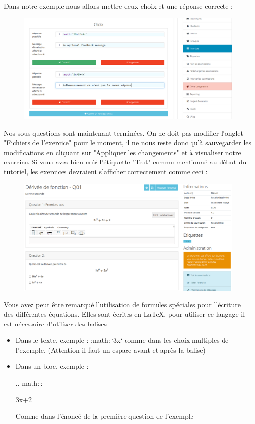 \documentclass{article}
\begin{document}
Dans notre exemple nous allons mettre deux choix et une réponse correcte :

\begin{figure}[!htb]
    \centering
    \includegraphics[scale=0.5]{images/qcm.png}
\end{figure}

\newpage
Nos sous-questions sont maintenant terminées. On ne doit pas modifier l'onglet "Fichiers de l'exercice" pour le moment, il ne nous reste donc qu'à sauvegarder les modifications en cliquant sur "Appliquer les changements" et à visualiser notre exercice.
Si vous avez bien créé l'étiquette "Test" comme mentionné au début du tutoriel, les exercices devraient s'afficher correctement comme ceci :

\begin{figure}[!htbp]
    \centering
    \includegraphics[scale=0.48]{images/exo_fini.png}
\end{figure}
\newpage


Vous avez peut être remarqué l'utilisation de formules spéciales pour l'écriture des différentes équations. Elles sont écrites en LaTeX, pour utiliser ce langage il est nécessaire d'utiliser des balises.
\bigskip

\begin{itemize}
    \item Dans le texte, exemple : :math${:}$`3x` comme dans les choix multiples de l'exemple. (Attention il faut un espace avant et après la balise)
    \item Dans un bloc, exemple :
    
    .. math${::}$
    
    \hspace{1cm} 3x+2
    
    Comme dans l'énoncé de la première question de l'exemple
\end{itemize}
\end{document}
